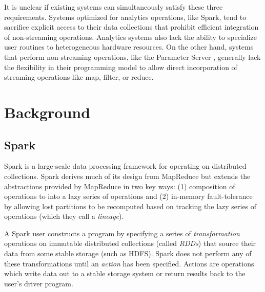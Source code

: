 \documentclass[tog]{acmsiggraph}
\begin{document}
It is unclear if existing systems can simultaneously satisfy these three
requirements. Systems optimized for analytics operations, like Spark, tend to
sacrifice explicit access to their data collections that prohibit efficient
integration of non-streaming operations. Analytics systems also lack the
ability to specialize user routines to heterogeneous hardware resources. On the
other hand, systems that perform non-streaming operations, like the Parameter
Server \cite{li2014scaling}, generally lack the flexibility in their
programming model to allow direct incorporation of streaming operations like
map, filter, or reduce.

\section{Background}

\subsection{Spark}
Spark \cite{zaharia2012resilient} is a large-scale data processing framework
for operating on distributed collections. Spark derives much of its design from
MapReduce \cite{dean2008mapreduce} but extends the abstractions provided by
MapReduce in two key ways: (1) composition of operations to into a lazy series
of operations and (2) in-memory fault-tolerance by allowing lost partitions to
be recomputed based on tracking the lazy series of operations (which they call
a \textit{lineage}).

A Spark user constructs a program by specifying a series of
\textit{transformation} operations on immutable distributed collections (called
\textit{RDDs}) that source their data from some stable storage (such as
HDFS). Spark does not perform any of these transformations until an
\textit{action} has been specified. Actions are operations which write data out
to a stable storage system or return results back to the user's driver
program.

\end{document}
